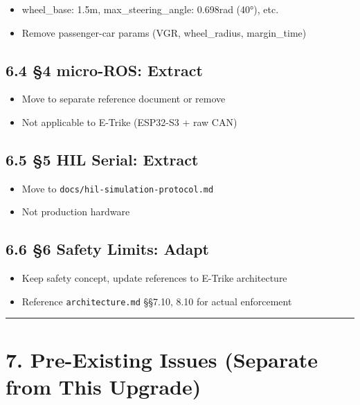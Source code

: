 \documentclass[12pt,a4paper,oneside]{report}
\providecommand{\tightlist}{\setlength{\itemsep}{0pt}\setlength{\parskip}{0pt}}
\begin{document}
\begin{itemize}
\tightlist
\item
  wheel\_base: 1.5m, max\_steering\_angle: 0.698rad (40°), etc.
\item
  Remove passenger-car params (VGR, wheel\_radius, margin\_time)
\end{itemize}

\subsection{6.4 §4 micro-ROS: Extract}\label{micro-ros-extract}

\begin{itemize}
\tightlist
\item
  Move to separate reference document or remove
\item
  Not applicable to E-Trike (ESP32-S3 + raw CAN)
\end{itemize}

\subsection{6.5 §5 HIL Serial: Extract}\label{hil-serial-extract}

\begin{itemize}
\tightlist
\item
  Move to \texttt{docs/hil-simulation-protocol.md}
\item
  Not production hardware
\end{itemize}

\subsection{6.6 §6 Safety Limits: Adapt}\label{safety-limits-adapt}

\begin{itemize}
\tightlist
\item
  Keep safety concept, update references to E-Trike architecture
\item
  Reference \texttt{architecture.md} §§7.10, 8.10 for actual enforcement
\end{itemize}

\begin{center}\rule{0.5\linewidth}{0.5pt}\end{center}

\section{7. Pre-Existing Issues (Separate from This
Upgrade)}\label{pre-existing-issues-separate-from-this-upgrade}
\end{document}
